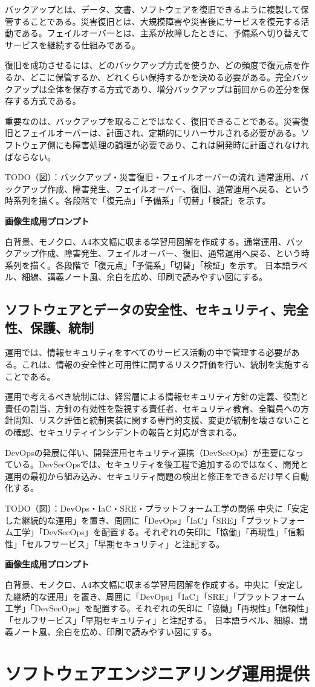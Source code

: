 \documentclass[uplatex,dvipdfmx,a4paper,10pt]{jsarticle}
\newcommand{\todoprompt}[2]{%
\begin{notebox}{TODO（図）：#1}
#2

\textbf{画像生成用プロンプト}

白背景、モノクロ、A4本文幅に収まる学習用図解を作成する。#2 日本語ラベル、細線、講義ノート風、余白を広め、印刷で読みやすい図にする。
\end{notebox}
}
\begin{document}
バックアップとは、データ、文書、ソフトウェアを復旧できるように複製して保管することである。災害復旧とは、大規模障害や災害後にサービスを復元する活動である。フェイルオーバーとは、主系が故障したときに、予備系へ切り替えてサービスを継続する仕組みである。

復旧を成功させるには、どのバックアップ方式を使うか、どの頻度で復元点を作るか、どこに保管するか、どれくらい保持するかを決める必要がある。完全バックアップは全体を保存する方式であり、増分バックアップは前回からの差分を保存する方式である。

重要なのは、バックアップを取ることではなく、復旧できることである。災害復旧とフェイルオーバーは、計画され、定期的にリハーサルされる必要がある。ソフトウェア側にも障害処理の論理が必要であり、これは開発時に計画されなければならない。

\todoprompt{バックアップ・災害復旧・フェイルオーバーの流れ}{通常運用、バックアップ作成、障害発生、フェイルオーバー、復旧、通常運用へ戻る、という時系列を描く。各段階で「復元点」「予備系」「切替」「検証」を示す。}

\subsection{ソフトウェアとデータの安全性、セキュリティ、完全性、保護、統制}

運用では、情報セキュリティをすべてのサービス活動の中で管理する必要がある。これは、情報の安全性と可用性に関するリスク評価を行い、統制を実施することである。

運用で考えるべき統制には、経営層による情報セキュリティ方針の定義、役割と責任の割当、方針の有効性を監視する責任者、セキュリティ教育、全職員への方針周知、リスク評価と統制実装に関する専門的支援、変更が統制を壊さないことの確認、セキュリティインシデントの報告と対応が含まれる。

DevOpsの発展に伴い、開発運用セキュリティ連携（DevSecOps）が重要になっている。DevSecOpsでは、セキュリティを後工程で追加するのではなく、開発と運用の最初から組み込み、セキュリティ問題の検出と修正をできるだけ早く自動化する。

\todoprompt{DevOps・IaC・SRE・プラットフォーム工学の関係}{中央に「安定した継続的な運用」を置き、周囲に「DevOps」「IaC」「SRE」「プラットフォーム工学」「DevSecOps」を配置する。それぞれの矢印に「協働」「再現性」「信頼性」「セルフサービス」「早期セキュリティ」と注記する。}

\section{ソフトウェアエンジニアリング運用提供}
\end{document}
